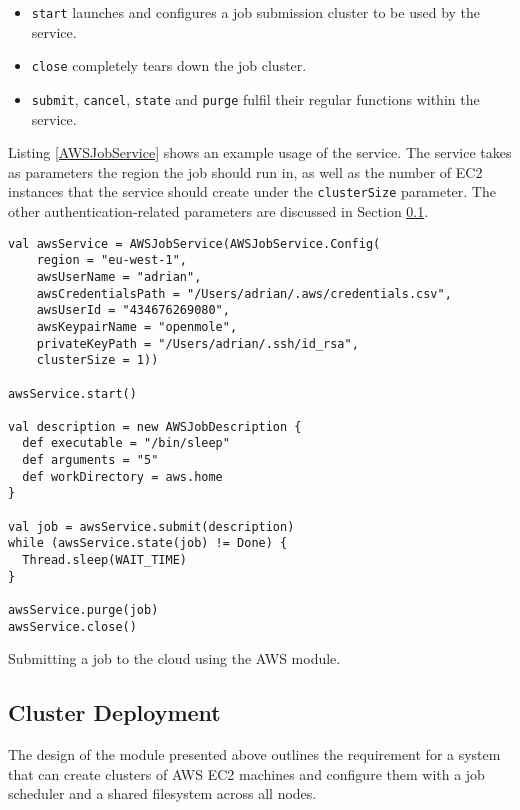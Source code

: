 \begin{itemize}
	\item \verb|start| launches and configures a job submission cluster to be used by the service.
	\item \verb|close| completely tears down the job cluster.
	\item \verb|submit|, \verb|cancel|, \verb|state| and \verb|purge| fulfil their regular functions within the service.
\end{itemize}

Listing \ref{AWSJobService} shows an example usage of the service. The service takes as parameters the region the job should run in, as well as the number of EC2 instances that the service should create under the \verb|clusterSize| parameter. The other authentication-related parameters are discussed in Section \ref{ClusterDeploymentSection}.

\begin{listing}[h]
	\centering
	\begin{minipage}{11.8cm}
		\begin{verbatim}
val awsService = AWSJobService(AWSJobService.Config(
    region = "eu-west-1",
    awsUserName = "adrian",
    awsCredentialsPath = "/Users/adrian/.aws/credentials.csv",
    awsUserId = "434676269080",
    awsKeypairName = "openmole",
    privateKeyPath = "/Users/adrian/.ssh/id_rsa",
    clusterSize = 1))

awsService.start()

val description = new AWSJobDescription {
  def executable = "/bin/sleep"
  def arguments = "5"
  def workDirectory = aws.home
}

val job = awsService.submit(description)
while (awsService.state(job) != Done) {
  Thread.sleep(WAIT_TIME)
}

awsService.purge(job)
awsService.close()
		\end{verbatim}
	\end{minipage}
	\caption{Submitting a job to the cloud using the AWS module.}
	\label{AWSJobService}
\end{listing}

\vspace{-5mm}
\subsection{Cluster Deployment} \label{ClusterDeploymentSection}

The design of the module presented above outlines the requirement for a system that can create clusters of AWS EC2 machines and configure them with a job scheduler and a shared filesystem across all nodes.

